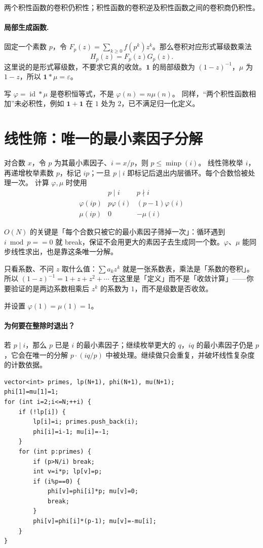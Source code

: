 \documentclass[UTF8,a4paper,11pt,twoside,openright,fontset=fandol]{ctexbook}
\theoremstyle{definition}
\newcommand{\eps}{\varepsilon}
\newcommand{\one}{\mathbf 1}
\newcommand{\id}{\operatorname{id}}
\begin{document}
两个积性函数的卷积仍积性；积性函数的卷积逆及积性函数之间的卷积商仍积性。


\paragraph{局部生成函数.}
固定一个素数 $p$，令 $F_p(z)=\sum_{k\ge0}f(p^k)z^k$。那么卷积对应形式幂级数乘法
\[
 H_p(z)=F_p(z)G_p(z).
\]
这里说的是形式幂级数，不要求它真的收敛。$\one$ 的局部级数为 $(1-z)^{-1}$，$\mu$ 为 $1-z$，所以 $\one*\mu=\eps$。
\begin{pitfall}
写 $\varphi=\id*\mu$ 是卷积恒等式，不是 $\varphi(n)=n\mu(n)$。
同样，“两个积性函数相加”未必积性，例如 $\one+\one$ 在 $1$ 处为 $2$，已不满足归一化定义。
\end{pitfall}


\section{线性筛：唯一的最小素因子分解}
对合数 $x$，令 $p$ 为其最小素因子、$i=x/p$，则 $p\le\operatorname{minp}(i)$。
线性筛枚举 $i$，再递增枚举素数 $p$，标记 $ip$；一旦 $p\mid i$ 即标记后退出内层循环。每个合数恰被处理一次。
计算 $\varphi,\mu$ 时使用
\[
\begin{array}{c|cc}
 &p\mid i&p\nmid i\\\hline
\varphi(ip)&p\varphi(i)&(p-1)\varphi(i)\\
\mu(ip)&0&-\mu(i)
\end{array}
\]

\begin{tip}
$O(N)$ 的关键是「每个合数只被它的最小素因子筛掉一次」：循环遇到 $i\bmod p==0$ 就 break，保证不会用更大的素因子去生成同一个数。$\varphi$、$\mu$ 能同步线性求出，也是靠这条唯一分解。
\end{tip}

\begin{tip}[「形式」两个字的含义]
只看系数、不问 $z$ 取什么值：$\sum a_kz^k$ 就是一张系数表，乘法是「系数的卷积」。所以 $(1-z)^{-1}=1+z+z^2+\cdots$ 在这里是「定义」而不是「收敛计算」——你要验证的是两边系数相乘后 $z^k$ 的系数为 $1$，而不是级数是否收敛。
\end{tip}

并设置 $\varphi(1)=\mu(1)=1$。


\paragraph{为何要在整除时退出？}
若 $p\mid i$，那么 $p$ 已是 $i$ 的最小素因子；继续枚举更大的 $q$，$iq$ 的最小素因子仍是 $p$，它会在唯一的分解 $p\cdot(iq/p)$ 中被处理。继续做只会重复，并破坏线性复杂度的计数依据。
\begin{lstlisting}
vector<int> primes, lp(N+1), phi(N+1), mu(N+1);
phi[1]=mu[1]=1;
for (int i=2;i<=N;++i) {
    if (!lp[i]) {
        lp[i]=i; primes.push_back(i);
        phi[i]=i-1; mu[i]=-1;
    }
    for (int p:primes) {
        if (p>N/i) break;
        int v=i*p; lp[v]=p;
        if (i%p==0) {
            phi[v]=phi[i]*p; mu[v]=0;
            break;
        }
        phi[v]=phi[i]*(p-1); mu[v]=-mu[i];
    }
}
\end{lstlisting}
\end{document}
